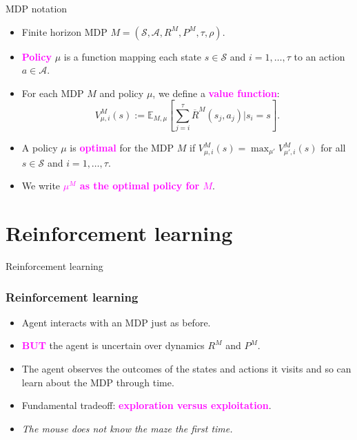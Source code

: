\documentclass{beamer}
\newlength{\wideitemsep}
\let\olditem\item
\renewcommand{\item}{\setlength{\itemsep}{\wideitemsep}\olditem}
\newcommand{\Exp}{\mathds{E}}
\newcommand{\Sc}{\mathcal{S}}
\newcommand{\Ac}{\mathcal{A}}
\newcommand{\bspace}{\vspace{3mm}}
\newcommand{\hilite}[1]{\textcolor{magenta}{\textbf{#1}}}
\begin{document}
\begin{frame}{MDP notation}
\begin{itemize}
    \item Finite horizon MDP $M = (\Sc, \Ac, R^M, P^M, \tau, \rho)$.
    \bspace
    \item \hilite{Policy} $\mu$ is a function mapping each state $s \in \Sc$ and $i = 1,\ldots,\tau$ to an action $a \in \Ac$.
    \bspace
    \item For each MDP $M$ and policy $\mu$, we define a \hilite{value function}:
$$V^{M}_{\mu, i}(s) := \Exp_{M,\mu}\left[ \sum_{j=i}^{\tau} \overline{R}^M(s_j,a_j) \Big| s_i = s \right].$$
    \item A policy $\mu$ is \hilite{optimal} for the MDP $M$ if $V^{M}_{\mu, i}(s) = \max_{\mu'} V^{M}_{\mu', i}(s)$ for all $s \in \Sc$ and $i=1,\ldots,\tau$.
    \bspace
    \item We write \hilite{$\mu^M$ as the optimal policy for $M$}.
\end{itemize}
\end{frame}

\section{Reinforcement learning}

\begin{frame}
\begin{block}{\Huge{Reinforcement learning}}
\end{block}
\end{frame}


\begin{frame}
\frametitle{Reinforcement learning}
\begin{itemize}
    \item Agent interacts with an MDP just as before.
    \bspace
    \item \hilite{BUT} the agent is uncertain over dynamics $R^M$ and $P^M$. \\
    \bspace
    \item The agent observes the outcomes of the states and actions it visits and so can learn about the MDP through time.
    \bspace
    \item Fundamental tradeoff: \pause \hilite{exploration versus exploitation}.
    \pause
    \bspace
    \item \emph{The mouse does not know the maze the first time.}
\end{itemize}
\end{frame}
\end{document}
